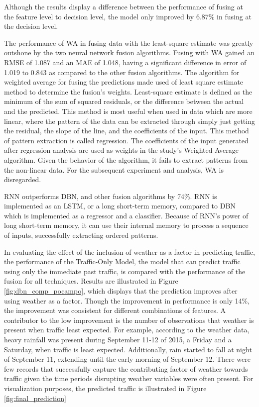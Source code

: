 Although the results display a difference between the performance of fusing at the feature level to decision level, the model only improved by 6.87\% in fusing at the decision level. 

The performance of WA in fusing data with the least-square estimate was greatly outshone by the two neural network fusion algorithms. Fusing with WA gained an RMSE of 1.087 and an MAE of 1.048, having a significant difference in error of 1.019 to 0.843 as compared to the other fusion algorithms. The algorithm for weighted average for fusing the predictions made used of least square estimate method to determine the fusion’s weights. Least-square estimate is defined as the minimum of the sum of squared residuals, or the difference between the actual and the predicted. This method is most useful when used in data which are more linear, where the pattern of the data can be extracted through simply just getting the residual, the slope of the line, and the coefficients of the input. This method of pattern extraction is called regression. The coefficients of the input generated after regression analysis are used as weights in the study’s Weighted Average algorithm. Given the behavior of the algorithm, it fails to extract patterns from the non-linear data. For the subsequent experiment and analysis, WA is disregarded. 

RNN outperforms DBN, and other fusion algorithms by 74\%. RNN is implemented as an LSTM, or a long short-term memory, compared to DBN which is implemented as a regressor and a classifier. Because of RNN’s power of long short-term memory, it can use their internal memory to process a sequence of inputs, successfully extracting ordered patterns. 

In evaluating the effect of the inclusion of weather as a factor in predicting traffic, the performance of the Traffic-Only Model, the model that can predict traffic using only the immediate past traffic, is compared with the performance of the fusion for all techniques. Results are illustrated in Figure \ref{fig:dbn_comp_pocampo}, which displays that the prediction improves after using weather as a factor. Though the improvement in performance is only 14\%, the improvement was consistent for different combinations of features. A contributor to the low improvement is the number of observations that weather is present when traffic least expected. For example, according to the weather data, heavy rainfall was present during September 11-12 of 2015, a Friday and a Saturday, when traffic is least expected. Additionally, rain started to fall at night of September 11, extending until the early morning of September 12. There were few records that successfully capture the contributing factor of weather towards traffic given the time periods disrupting weather variables were often present. For visualization purposes, the predicted traffic is illustrated in Figure \ref{fig:final_prediction}

